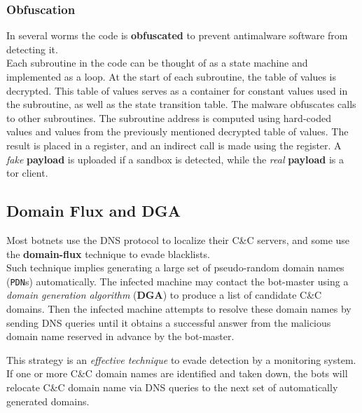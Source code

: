 \subsubsection{Obfuscation}
In several worms the code is \textbf{obfuscated} to prevent antimalware software from detecting it.\\
Each subroutine in the code can be thought of as a state machine and implemented as a
loop. 
At the start of each subroutine, the table of values is decrypted.
This table of values serves as a container for constant values used in the
subroutine, as well as the state transition table.
The malware obfuscates calls to other subroutines.
The subroutine address
is computed using hard-coded values and values from the previously
mentioned decrypted table of values. The result is placed in a register, and an
indirect call is made using the register.
A \textit{fake} \textbf{payload} is uploaded if a sandbox is detected, while the \textit{real} \textbf{payload} is a tor client.

\subsection{Domain Flux and DGA}
Most botnets use the DNS protocol to localize their C\&C servers, and some
use the \textbf{domain-flux} technique to evade blacklists.\\
Such technique implies generating a large set of pseudo-random domain names (\texttt{PDN}s) automatically.
The infected machine may contact the bot-master using a \textit{domain generation
algorithm} (\textbf{DGA}) to produce a list of candidate C\&C domains.
Then the infected machine attempts to resolve these domain names by sending
DNS queries until it obtains a successful answer from the malicious domain name reserved in advance by the bot-master.

This strategy is an \textit{effective technique} to evade detection by a monitoring system.
If one or more C\&C domain names are identified and taken down, the bots will
relocate C\&C domain name via DNS queries to the next set of automatically
generated domains.
\nl

